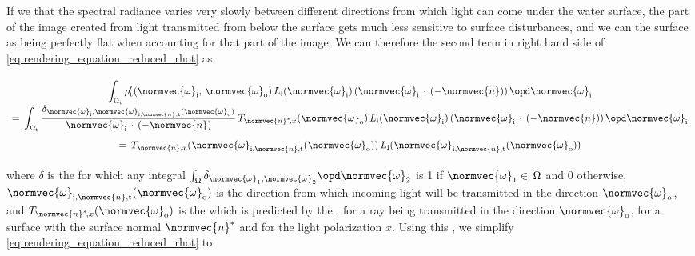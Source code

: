 If we \assume that the spectral radiance varies very slowly between different directions from which light can come under the water surface, the part of the image created from light transmitted from below the surface gets much less sensitive to surface disturbances, and we can \approximate the surface as being perfectly flat when accounting for that part of the image. We can therefore \approximate the second term in right hand side of \eqref{eq:rendering_equation_reduced_rhot} as

\begin{equation}
\renewcommand*{\arraystretch}{2}
\begin{array}{c}
\displaystyle \int_{\Omega_{\text{t}}} \rho'_{\text{t}}(\normvec{\omega}_{\text{i}},\, \normvec{\omega}_{\text{o}})\, L_{\text{i}}(\normvec{\omega}_{\text{i}})\, (\normvec{\omega}_{\text{i}}\,\cdot\,(-\normvec{n}))\, \opd \normvec{\omega}_{\text{i}} \\
\displaystyle =\, \int_{\Omega_{\text{t}}} \frac{\delta_{\normvec{\omega}_{\text{i}},\normvec{\omega}_{\text{i},\normvec{n},\text{t}}(\normvec{\omega}_{\text{o}})}}{\normvec{\omega}_{\text{i}}\,\cdot\,(-\normvec{n})}\,T_{\normvec{n}^*\!,x}(\normvec{\omega}_{\text{o}})\, L_{\text{i}}(\normvec{\omega}_{\text{i}})\, (\normvec{\omega}_{\text{i}}\,\cdot\,(-\normvec{n}))\, \opd \normvec{\omega}_{\text{i}} \\
\displaystyle =\, T_{\normvec{n},x}(\normvec{\omega}_{\text{i},\normvec{n},\text{t}}(\normvec{\omega}_{\text{o}}))\, L_{\text{i}}(\normvec{\omega}_{\text{i},\normvec{n},\text{t}}(\normvec{\omega}_{\text{o}}))
\end{array}
\end{equation}

where $\delta$ is the  for which any integral $\int_{\Omega}\delta_{\normvec{\omega}_1,\normvec{\omega}_2}\opd \normvec{\omega}_2$ is 1 if $\normvec{\omega}_1 \in\, \Omega$ and 0 otherwise, $\normvec{\omega}_{\text{i},\normvec{n},\text{t}}(\normvec{\omega}_{\text{o}})$ is the direction from which incoming light will be transmitted in the direction $\normvec{\omega}_{\text{o}}$, and $T_{\normvec{n}^*\!,x}(\normvec{\omega}_{\text{o}})$ is the  which is predicted by the , for a ray being transmitted in the direction $\normvec{\omega}_{\text{o}}$, for a surface with the surface normal $\normvec{n}^*$ and for the light polarization $x$. Using this \approximation, we simplify \eqref{eq:rendering_equation_reduced_rhot} to

